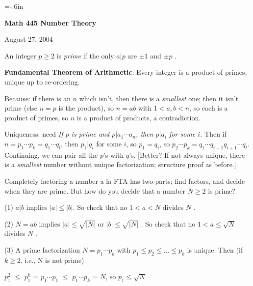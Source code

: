 

\loadmsbm

\nopagenumbers
\parindent=-20pt
\voffset=-.6in


\def\ctln{\centerline}
\def\u{\underbar}
\def\zzz{{\Bbb Z}}

\ctln{\bf Math 445 Number Theory}

\medskip

\ctln{August 27, 2004}

\bigskip

An integer $p\geq 2$ is {\it prime} if the only $a|p$ are
$\pm 1$ and $\pm p$ .

\medskip

{\bf Fundamental Theorem of Arithmetic}: Every integer is a product 
of primes, unique up to re-ordering.

\smallskip

Because: if there is an $n$ which isn't, then there is a {\it smallest}
one; then it isn't prime (else $n=p$ is the product), so $n=ab$ with
$1<a,b<n$, so each is a product of primes, so $n$ is a product of \u{their}
products, a contradiction.

Uniqueness: need {\it If $p$ is prime and $p|a_1\cdots a_n$, then $p|a_i$
for some $i$.} Then if $n=p_1\cdots p_k = q_1\cdots q_l$, then $p_1|q_i$
for some $i$, so $p_1=q_i$, so $p_2\cdots p_k = q_1\cdots q_{i-1}q_{i+1}\cdots
q_l$. Continuing, we can pair all the $p$'s with $q$'s. [Better? If not
always unique, there is a {\it smallest} number without unique factorization;
structure proof as before.]

\medskip

Completely factoring a number a la FTA has two parts; find factors, and 
decide when they are prime. But how do you decide that a number $N\geq 2$ 
is prime?

\medskip

(1) $a|b$ implies $|a|\leq |b|$. So check that no $1<a<N$ divides $N$ .

\smallskip

(2) $N=ab$ implies $|a|\leq \sqrt{|N|}$ or $|b|\leq \sqrt{|N|}$ . So 
check that no $1<a\leq\sqrt{N}$ divides $N$ .

\smallskip

(3) A prime factorization $N=p_1\cdots p_k$ with $p_1\leq p_2\leq \ldots \leq p_k$
is unique. Then (if $k\geq 2$, i.e., N is not prime) 

\smallskip

\ctln{$p_1^2$ $\leq$ $p_1^k$ = $p_1\cdots p_1$ $\leq$ $p_1\cdots p_k$ = $N$, so $p_1\leq
\sqrt{N}$}

